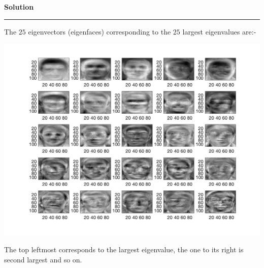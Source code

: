 \documentclass[a4paper,12pt]{article}
\newenvironment{solution}[2][]{%
    \begin{mdframed}[linecolor=blue!70!black, linewidth=2pt, roundcorner=10pt, backgroundcolor=yellow!10!white, skipabove=12pt, skipbelow=12pt]%
        \textbf{\large #2}
        \par\noindent\rule{\textwidth}{0.4pt}
}{
    \end{mdframed}
}
\begin{document}
\begin{solution}{Solution}
\begin{itemize}
		The $25$ eigenvectors (eigenfaces) corresponding to the $25$ largest eigenvalues are:-

		\begin{center}
			\includegraphics[width=0.88\linewidth]{../images/ORL_eigenfaces.png}
		\end{center}

		The top leftmost corresponds to the largest eigenvalue, the one to its right is second largest and so on.
	\end{itemize}
\end{solution}
\end{document}
